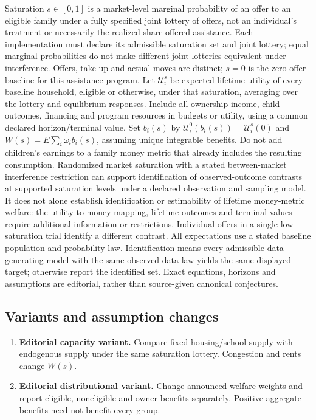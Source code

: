 \documentclass[11pt,a4paper]{article}
\begin{document}
Saturation \(s\in[0,1]\) is a market-level marginal probability of an offer to an eligible family under a fully specified joint lottery of offers, not an individual's treatment or necessarily the realized share offered assistance. Each implementation must declare its admissible saturation set and joint lottery; equal marginal probabilities do not make different joint lotteries equivalent under interference. Offers, take-up and actual moves are distinct; \(s=0\) is the zero-offer baseline for this assistance program. Let \(\mathcal U_i^s\) be expected lifetime utility of every baseline household, eligible or otherwise, under that saturation, averaging over the lottery and equilibrium responses. Include all ownership income, child outcomes, financing and program resources in budgets or utility, using a common declared horizon/terminal value. Set \(b_i(s)\) by \(\mathcal U_i^0(b_i(s))=\mathcal U_i^s(0)\) and \(W(s)=E\sum_i\omega_i b_i(s)\), assuming unique integrable benefits. Do not add children's earnings to a family money metric that already includes the resulting consumption. Randomized market saturation with a stated between-market interference restriction can support identification of observed-outcome contrasts at supported saturation levels under a declared observation and sampling model. It does not alone establish identification or estimability of lifetime money-metric welfare: the utility-to-money mapping, lifetime outcomes and terminal values require additional information or restrictions. Individual offers in a single low-saturation trial identify a different contrast. All expectations use a stated baseline population and probability law. Identification means every admissible data-generating model with the same observed-data law yields the same displayed target; otherwise report the identified set. Exact equations, horizons and assumptions are editorial, rather than source-given canonical conjectures.
\subsection*{Variants and assumption changes}
\begin{enumerate}
\item \textbf{Editorial capacity variant.} Compare fixed housing/school supply with endogenous supply under the same saturation lottery. Congestion and rents change \(W(s)\).
\item \textbf{Editorial distributional variant.} Change announced welfare weights and report eligible, noneligible and owner benefits separately. Positive aggregate benefits need not benefit every group.
\end{enumerate}
\end{document}

